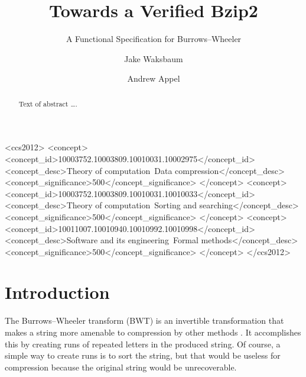\documentclass[sigplan,10pt,anonymous,review]{thesis}
\begin{document}
\title{Towards a Verified Bzip2}
\subtitle{A Functional Specification for Burrows--Wheeler}

\author{Jake Waksbaum}

\author{Andrew Appel}

\begin{abstract}
Text of abstract \ldots.
\end{abstract}

\begin{CCSXML} <ccs2012>
<concept>
<concept_id>10003752.10003809.10010031.10002975</concept_id>
<concept_desc>Theory of computation~Data compression</concept_desc>
<concept_significance>500</concept_significance>
</concept>
<concept>
<concept_id>10003752.10003809.10010031.10010033</concept_id>
<concept_desc>Theory of computation~Sorting and searching</concept_desc>
<concept_significance>500</concept_significance>
</concept>
<concept>
<concept_id>10011007.10010940.10010992.10010998</concept_id>
<concept_desc>Software and its engineering~Formal methods</concept_desc>
<concept_significance>500</concept_significance>
</concept>
</ccs2012>
\end{CCSXML}



\maketitle

\section{Introduction}
\label{sec:intro}

The Burrows--Wheeler transform (BWT) is an invertible transformation
that makes a string more amenable to compression by other methods
\cite{bw}. It accomplishes this by creating runs of repeated letters
in the produced string. Of course, a simple way to create runs is to
sort the string, but that would be useless for compression because the
original string would be unrecoverable.
\end{document}
